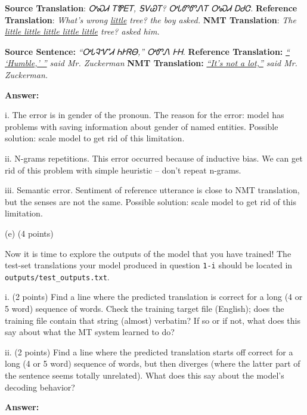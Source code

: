 \documentclass{article}
\begin{document}
	\smallbreak
	\textbf{Source Translation}: \textit{{\cherokeefam ᎤᏍᏗ ᎢᏈᎬᎢ, ᎦᏙᏊᎢ? ᎤᏓᏛᏛᏁᎢ ᎤᏍᏗ ᎠᏧᏣ.}}\newline
	\textbf{Reference Translation}: \textit{What's wrong \underline{little} tree? the boy asked.}\newline
	\textbf{NMT Translation}: \textit{ The \underline{little little little little little} tree? asked him.}
	
	\smallbreak
	\textbf{Source Sentence:} \textit{{\cherokeefam “ᎤᏓᎸᏉᏗ ᏂᎨᏒᎾ,” ᎤᏛᏁ ᎰᎻ.}}\newline
	\textbf{Reference Translation:} \textit{\underline{“ ‘Humble,’ ”} said Mr. Zuckerman}\newline
	\textbf{NMT Translation:} \textit{\underline{“It’s not a lot,”} said Mr. Zuckerman.}
	
	\smallbreak
	\textbf{Answer:}
	
		
	
	i. The error is in gender of the pronoun. The reason for the error: model has problems with saving information about gender of named entities. Possible solution: scale model to get rid of this limitation. 
	
	ii. N-grams repetitions. This error occurred because of inductive bias. We can get rid of this problem with simple heuristic – don’t repeat n-grams.
	
	iii. Semantic error. Sentiment of reference utterance is close to NMT translation, but the senses are not the same. Possible solution: scale model to get rid of this limitation.
	
	
	\bigbreak
	(e) (4 points)
	
	Now it is time to explore the outputs of the model that you have trained! The test-set translations your model produced in question \texttt{1-i} should be located in \texttt{outputs/test\_outputs.txt}. 

	i. (2 points) Find a line where the predicted translation is correct for a long (4 or 5 word) sequence of words. Check the training target file (English); does the training file contain that string (almost) verbatim? If so or if not, what does this say about what the MT system learned to do?
	
	ii. (2 points) Find a line where the predicted translation starts off correct for a long (4 or 5 word) sequence of words, but then diverges (where the latter part of the sentence seems totally unrelated). What does this say about the model's decoding behavior?


	\smallbreak
	\textbf{Answer:}
	
\end{document}
